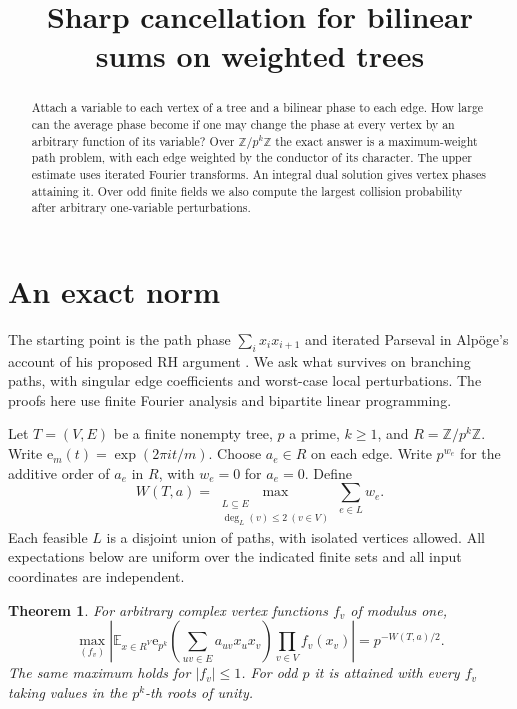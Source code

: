\documentclass[10pt]{article}
\title{Sharp cancellation for bilinear sums on weighted trees}
\author{}
\date{}
\newtheorem{theorem}{Theorem}
\newcommand{\E}{\mathbb E}
\newcommand{\Z}{\mathbb Z}
\newcommand{\ee}{\mathrm e}
\newcommand{\abs}[1]{\left|#1\right|}
\begin{document}
\maketitle
\vspace{-3.7em}

\begin{abstract}
Attach a variable to each vertex of a tree and a bilinear phase to each
edge. How large can the average phase become if one may change the phase
at every vertex by an arbitrary function of its variable? Over
$\Z/p^k\Z$ the exact answer is a maximum-weight path problem, with each
edge weighted by the conductor of its character. The upper estimate uses
iterated Fourier transforms. An integral dual solution gives vertex
phases attaining it. Over odd finite fields we also compute the largest
collision probability after arbitrary one-variable perturbations.
\end{abstract}

\section{An exact norm}
The starting point is the path phase $\sum_i x_ix_{i+1}$ and iterated
Parseval in Alp\"oge's account of his proposed RH argument
\cite[p.~3, footnote 3]{alpoge}. We ask what survives on branching paths,
with singular edge coefficients and worst-case local perturbations.
The proofs here use finite Fourier analysis and bipartite linear
programming.

Let $T=(V,E)$ be a finite nonempty tree, $p$ a prime, $k\ge1$, and
$R=\Z/p^k\Z$. Write $\ee_m(t)=\exp(2\pi i t/m)$. Choose $a_e\in R$
on each edge. Write $p^{w_e}$ for the additive order of $a_e$ in $R$,
with $w_e=0$ for $a_e=0$. Define
\[
 W(T,a)=\max_{\substack{L\subseteq E\\ \deg_L(v)\le2\ (v\in V)}}
                \sum_{e\in L}w_e.
\]
Each feasible $L$ is a disjoint union of paths, with isolated vertices
allowed. All expectations below are uniform over the indicated finite
sets and all input coordinates are independent.

\begin{theorem}\label{thm:ring}
For arbitrary complex vertex functions $f_v$ of modulus one,
\[
 \max_{(f_v)}
 \abs{\E_{x\in R^V}
  \ee_{p^k}\!\left(\sum_{uv\in E}a_{uv}x_ux_v\right)
  \prod_{v\in V}f_v(x_v)}
     =p^{-W(T,a)/2}.
 \tag{1}
\]
The same maximum holds for $|f_v|\le1$. For odd $p$ it is attained with
every $f_v$ taking values in the $p^k$-th roots of unity.
\end{theorem}
\end{document}
